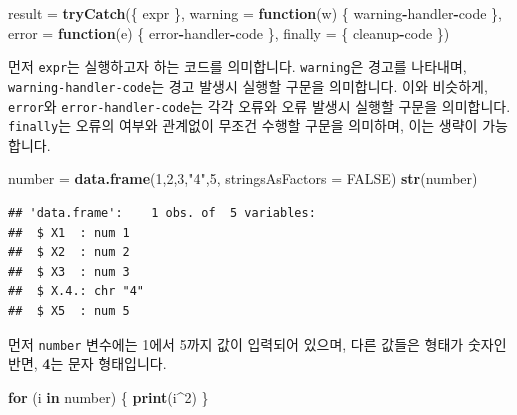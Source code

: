 \documentclass[12pt,]{book}
\newenvironment{Shaded}{\begin{snugshade}}{\end{snugshade}}
\newcommand{\ControlFlowTok}[1]{\textcolor[rgb]{0.13,0.29,0.53}{\textbf{#1}}}
\newcommand{\DataTypeTok}[1]{\textcolor[rgb]{0.13,0.29,0.53}{#1}}
\newcommand{\DecValTok}[1]{\textcolor[rgb]{0.00,0.00,0.81}{#1}}
\newcommand{\KeywordTok}[1]{\textcolor[rgb]{0.13,0.29,0.53}{\textbf{#1}}}
\newcommand{\NormalTok}[1]{#1}
\newcommand{\OperatorTok}[1]{\textcolor[rgb]{0.81,0.36,0.00}{\textbf{#1}}}
\newcommand{\OtherTok}[1]{\textcolor[rgb]{0.56,0.35,0.01}{#1}}
\newcommand{\StringTok}[1]{\textcolor[rgb]{0.31,0.60,0.02}{#1}}
\begin{document}
\begin{Shaded}
\begin{Highlighting}[]
\NormalTok{result =}\StringTok{ }\KeywordTok{tryCatch}\NormalTok{(\{}
\NormalTok{  expr}
\NormalTok{\}, }\DataTypeTok{warning =} \ControlFlowTok{function}\NormalTok{(w) \{}
\NormalTok{  warning}\OperatorTok{-}\NormalTok{handler}\OperatorTok{-}\NormalTok{code}
\NormalTok{\}, }\DataTypeTok{error =} \ControlFlowTok{function}\NormalTok{(e) \{}
\NormalTok{  error}\OperatorTok{-}\NormalTok{handler}\OperatorTok{-}\NormalTok{code}
\NormalTok{\}, }\DataTypeTok{finally =}\NormalTok{ \{}
\NormalTok{  cleanup}\OperatorTok{-}\NormalTok{code}
\NormalTok{\})}
\end{Highlighting}
\end{Shaded}

먼저 \texttt{expr}는 실행하고자 하는 코드를 의미합니다. \texttt{warning}은 경고를 나타내며, \texttt{warning-handler-code}는 경고 발생시 실행할 구문을 의미합니다. 이와 비슷하게, \texttt{error}와 \texttt{error-handler-code}는 각각 오류와 오류 발생시 실행할 구문을 의미합니다. \texttt{finally}는 오류의 여부와 관계없이 무조건 수행할 구문을 의미하며, 이는 생략이 가능합니다.

\begin{Shaded}
\begin{Highlighting}[]
\NormalTok{number =}\StringTok{ }\KeywordTok{data.frame}\NormalTok{(}\DecValTok{1}\NormalTok{,}\DecValTok{2}\NormalTok{,}\DecValTok{3}\NormalTok{,}\StringTok{"4"}\NormalTok{,}\DecValTok{5}\NormalTok{, }\DataTypeTok{stringsAsFactors =} \OtherTok{FALSE}\NormalTok{)}
\KeywordTok{str}\NormalTok{(number)}
\end{Highlighting}
\end{Shaded}

\begin{verbatim}
## 'data.frame':    1 obs. of  5 variables:
##  $ X1  : num 1
##  $ X2  : num 2
##  $ X3  : num 3
##  $ X.4.: chr "4"
##  $ X5  : num 5
\end{verbatim}

먼저 \texttt{number} 변수에는 1에서 5까지 값이 입력되어 있으며, 다른 값들은 형태가 숫자인 반면, \textbf{4}는 문자 형태입니다.

\begin{Shaded}
\begin{Highlighting}[]
\ControlFlowTok{for}\NormalTok{ (i }\ControlFlowTok{in}\NormalTok{ number) \{}
 \KeywordTok{print}\NormalTok{(i}\OperatorTok{^}\DecValTok{2}\NormalTok{)}
\NormalTok{\}}
\end{Highlighting}
\end{Shaded}
\end{document}
